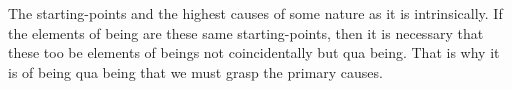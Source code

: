 The starting-points and the highest causes
of some nature as it is intrinsically.
If the elements of being are these same starting-points,
then it is necessary that these too be elements of beings
not coincidentally but qua being.
That is why it is of being qua being that we must
grasp the primary causes.


